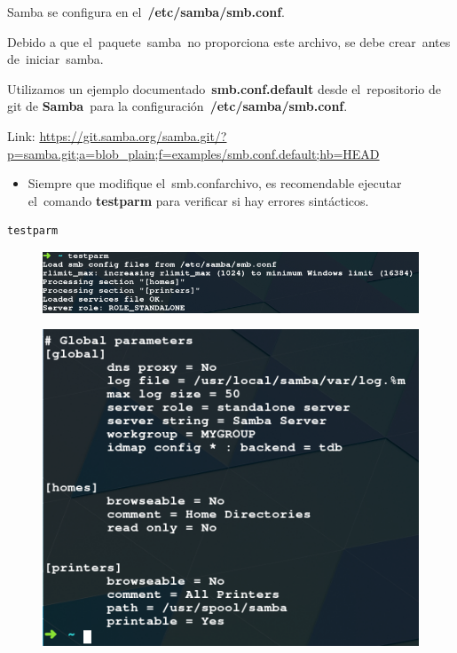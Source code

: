 \documentclass[12pt]{extarticle}
\providecommand{\tightlist}{%
      \setlength{\itemsep}{0pt}\setlength{\parskip}{0pt}}
\begin{document}
Samba se configura en el~\textbf{/etc/samba/smb.conf}.

Debido a que el~paquete~samba~no proporciona este archivo, se debe
crear~antes de~iniciar~samba.

Utilizamos un ejemplo documentado~\textbf{smb.conf.default} desde
el~repositorio de git de \textbf{Samba}~para la
configuración~\textbf{/etc/samba/smb.conf}.

Link:
\url{https://git.samba.org/samba.git/?p=samba.git;a=blob_plain;f=examples/smb.conf.default;hb=HEAD}

\begin{itemize}
\tightlist
\item
  Siempre que modifique el~smb.confarchivo, es recomendable ejecutar
  el~comando \textbf{testparm} para verificar si hay errores
  sintácticos.
\end{itemize}

\begin{verbatim}
testparm
\end{verbatim}

\begin{figure}
\centering
\includegraphics{images/testparm1.png}
\end{figure}

\begin{figure}
\centering
\includegraphics{images/testparm2.png}
\end{figure}
\end{document}
